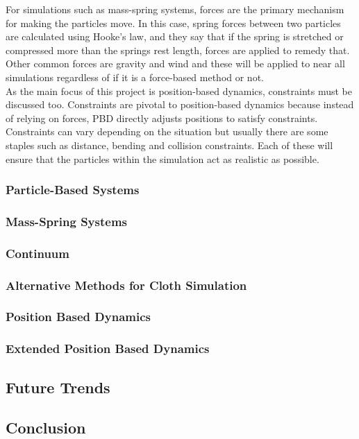 \documentclass[12pt,a4paper]{article}
\begin{document}
For simulations such as mass-spring systems, forces are the primary mechanism for making the particles move. In this case, spring forces between two particles are calculated using Hooke's law, and they say that if the spring is stretched or compressed more than the springs rest length, forces are applied to remedy that. Other common forces are gravity and wind and these will be applied to near all simulations regardless of if it is a force-based method or not.
\\

As the main focus of this project is position-based dynamics, constraints must be discussed too. Constraints are pivotal to position-based dynamics because instead of relying on forces, PBD directly adjusts positions to satisfy constraints. Constraints can vary depending on the situation but usually there are some staples such as distance, bending and collision constraints. Each of these will ensure that the particles within the simulation act as realistic as possible. 


\subsubsection{Particle-Based Systems}
\subsubsection{Mass-Spring Systems}
\subsubsection{Continuum}
\subsubsection{Alternative Methods for Cloth Simulation}
\subsubsection{Position Based Dynamics}
\subsubsection{Extended Position Based Dynamics}




\subsection{Future Trends}
\subsection{Conclusion}
\end{document}
